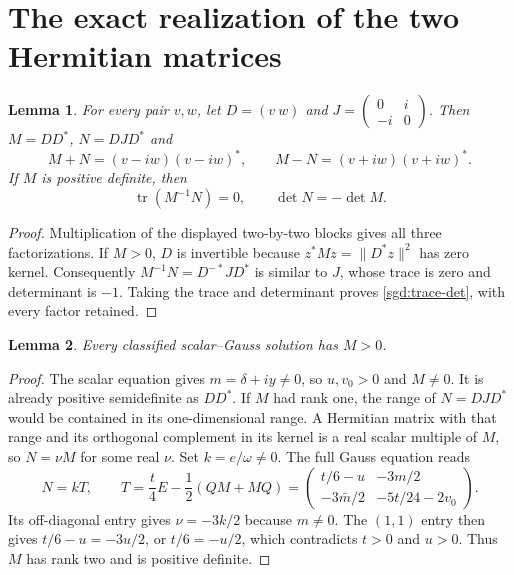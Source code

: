 \documentclass[11pt]{article}
\newtheorem{lemma}{Lemma}
\newcommand{\tr}{\operatorname{tr}}
\begin{document}
\section{The exact realization of the two Hermitian matrices}

\begin{lemma}\label{sgd:realization-necessity}
For every pair $v,w$, let $D=(v\ w)$ and
$J=\left(\begin{smallmatrix}0&i\\-i&0\end{smallmatrix}\right)$.
Then $M=DD^*$, $N=DJD^*$ and
\[
 M+N=(v-iw)(v-iw)^*,\qquad
 M-N=(v+iw)(v+iw)^*.
\]
If $M$ is positive definite, then
\begin{equation}
 \tr(M^{-1}N)=0,\qquad \det N=-\det M.
 \label{sgd:trace-det}
\end{equation}
\end{lemma}
\begin{proof}
Multiplication of the displayed two-by-two blocks gives all three
factorizations. If $M>0$, $D$ is invertible because
$z^*Mz=\|D^*z\|^2$ has zero kernel. Consequently
$M^{-1}N=D^{-*}JD^*$ is similar to $J$, whose trace is zero
and determinant is $-1$. Taking the trace and determinant proves
\eqref{sgd:trace-det}, with every factor retained.
\end{proof}

\begin{lemma}\label{sgd:rank-one-impossible}
Every classified scalar--Gauss solution has $M>0$.
\end{lemma}
\begin{proof}
The scalar equation gives $m=\delta+iy\ne0$, so $u,v_0>0$
and $M\ne0$. It is already positive semidefinite as $DD^*$.
If $M$ had rank one, the range of $N=DJD^*$ would be contained
in its one-dimensional range. A Hermitian matrix with that range
and its orthogonal complement in its kernel is a real scalar multiple
of $M$, so $N=\nu M$ for some real $\nu$.
Set $k=e/\omega\ne0$. The full Gauss equation reads
\begin{equation}
 N=kT,\qquad
 T=\frac t4 E-\frac12(QM+MQ)
  =\begin{pmatrix}t/6-u&-3m/2\\-3\bar m/2&-5t/24-2v_0\end{pmatrix}.
 \label{sgd:T}
\end{equation}
Its off-diagonal entry gives $\nu=-3k/2$ because $m\ne0$.
The $(1,1)$ entry then gives $t/6-u=-3u/2$, or $t/6=-u/2$,
which contradicts $t>0$ and $u>0$. Thus $M$ has rank two and is
positive definite.
\end{proof}
\end{document}
